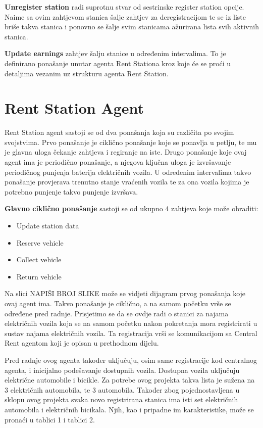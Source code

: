 \documentclass{foi}
\begin{document}
\textbf{Unregister station} radi suprotnu stvar od sestrinske register station opcije. Naime sa ovim zahtjevom stanica šalje zahtjev za deregistracijom te se iz liste briše takva stanica i ponovno se šalje svim stanicama ažurirana lista svih aktivnih stanica.

\textbf{Update earnings} zahtjev šalju stanice u određenim intervalima. To je definirano ponašanje unutar agenta Rent Stationa kroz koje će se proći u detaljima vezanim uz strukturu agenta Rent Station.

\section{Rent Station Agent}

Rent Station agent sastoji se od dva ponašanja koja su različita po svojim svojstvima. Prvo ponašanje je ciklično ponašanje koje se ponavlja u petlju, te mu je glavna uloga čekanje zahtjeva i regiranje na iste. Drugo ponašanje koje ovaj agent ima je periodično ponašanje, a njegova ključna uloga je izvršavanje periodičnog punjenja baterija električnih vozila. U određenim intervalima takvo ponašanje provjerava trenutno stanje vraćenih vozila te za ona vozila kojima je potrebno punjenje takvo punjenje izvršava.

\textbf{Glavno ciklično ponašanje} sastoji se od ukupno 4 zahtjeva koje može obraditi:
\begin{itemize}
	\item Update station data
	\item Reserve vehicle
	\item Collect vehicle
	\item Return vehicle
\end{itemize}

Na slici NAPIŠI BROJ SLIKE može se vidjeti dijagram prvog ponašanja koje ovaj agent ima. Takvo ponašanje je ciklično, a na samom početku vrše se određene pred radnje. Prisjetimo se da se ovdje radi o stanici za najama električnih vozila koja se na samom početku nakon pokretanja mora registrirati u sustav najama električnih vozila. Ta registracija vrši se komunikacijom sa Central Rent agentom koji je opisan u prethodnom dijelu. 

Pred radnje ovog agenta također uključuju, osim same registracije kod centralnog agenta, i inicijalno podešavanje dostupnih vozila. Dostupna vozila uključuju električne automobile i bicikle. Za potrebe ovog projekta takva lista je sužena na 3 električnih automobila, te 3 automobila. Također zbog pojednostavljena u sklopu ovog projekta svaka novo registrirana stanica ima isti set električnih automobila i električnih bicikala. Njih, kao i pripadne im karakteristike, može se pronaći u tablici 1 i tablici 2.
\end{document}
